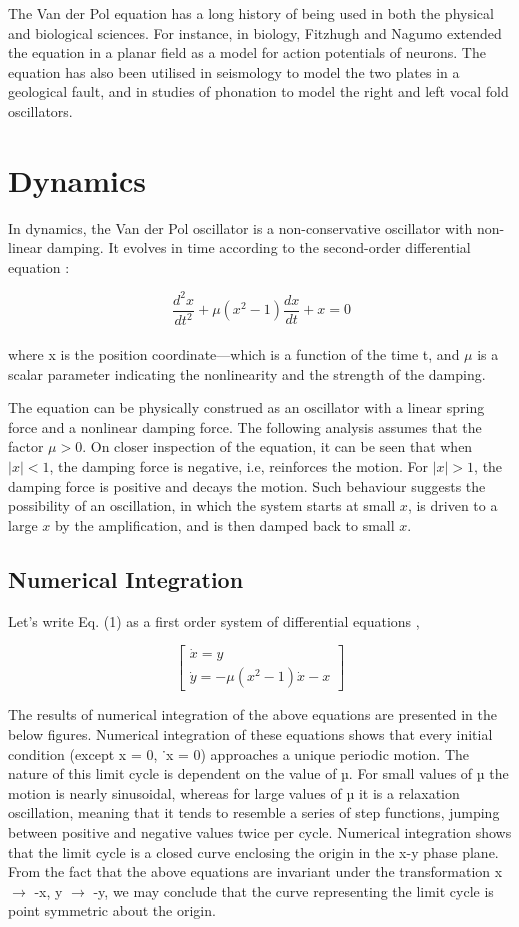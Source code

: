 \documentclass[12pt, a4paper]{report}
\begin{document}
The Van der Pol equation has a long history of being used in both the physical and biological sciences. For instance, in biology, Fitzhugh and Nagumo extended the equation in a planar field as a model for action potentials of neurons. The equation has also been utilised in seismology to model the two plates in a geological fault, and in studies of phonation to model the right and left vocal fold oscillators.

\chapter{Dynamics}
In dynamics, the Van der Pol oscillator is a non-conservative oscillator with non-linear damping. It evolves in time according to the second-order differential equation  :

\begin{equation}\
\frac{d^2 x}{dt^2}+\mu(x^2-1)\frac{dx}{dt}+x=0
\end{equation}\\

where x is the position coordinate—which is a function of the time t, and $\mu$ is a scalar parameter indicating the nonlinearity and the strength of the damping.

The equation can be physically construed as an oscillator with a linear spring force and a nonlinear damping force. The following analysis assumes that the factor $\mu >0$. On closer inspection of the equation, it can be seen that when $|x| <1$, the damping force is negative, i.e, reinforces the motion. For $|x| >1$, the damping force is positive and decays the motion. Such behaviour suggests the possibility of an oscillation, in which the system starts at small $x$, is driven to a large $x$ by the amplification, and is then damped back to small $x$.

\section{Numerical Integration}
Let’s write Eq. (1) as a first order system of differential equations \cite{Lienard} ,

\[
\begin{bmatrix}
\dot{x} = y \\
\dot{y} = -\mu(x^2-1)\dot{x}-x
\end{bmatrix}
\]

The results of numerical integration of the above equations are presented in the below figures. Numerical integration of these equations shows that every initial condition (except x = 0, ˙x = 0) approaches a unique periodic motion. The nature of this limit cycle is dependent on the value of µ. For small values of µ the motion is nearly sinusoidal, whereas for large values of µ it is a relaxation oscillation, meaning that it tends to resemble a series of step functions, jumping between positive and negative values twice per cycle. Numerical integration shows that the limit cycle is a closed curve enclosing the origin in the x-y phase plane. From the fact that the above equations are invariant under the transformation x $\rightarrow$ -x, y $\rightarrow$ -y, we may conclude that the curve representing the limit cycle is point symmetric about the origin. 
\end{document}
